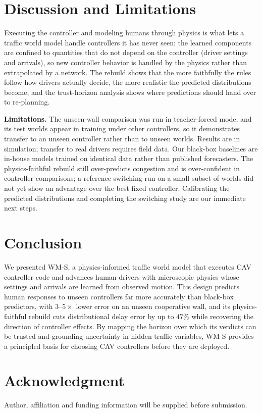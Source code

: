 \documentclass[conference]{IEEEtran}
\begin{document}
\section{Discussion and Limitations}
Executing the controller and modeling humans through physics is what lets a traffic world model handle controllers it has never seen: the learned components are confined to quantities that do not depend on the controller (driver settings and arrivals), so new controller behavior is handled by the physics rather than extrapolated by a network. The rebuild shows that the more faithfully the rules follow how drivers actually decide, the more realistic the predicted distributions become, and the trust-horizon analysis shows where predictions should hand over to re-planning.

\textbf{Limitations.} The unseen-wall comparison was run in teacher-forced mode, and its test worlds appear in training under other controllers, so it demonstrates transfer to an unseen controller rather than to unseen worlds. Results are in simulation; transfer to real drivers requires field data. Our black-box baselines are in-house models trained on identical data rather than published forecasters. The physics-faithful rebuild still over-predicts congestion and is over-confident in controller comparisons; a reference switching run on a small subset of worlds did not yet show an advantage over the best fixed controller. Calibrating the predicted distributions and completing the switching study are our immediate next steps.

\section{Conclusion}
We presented WM-S, a physics-informed traffic world model that executes CAV controller code and advances human drivers with microscopic physics whose settings and arrivals are learned from observed motion. This design predicts human responses to unseen controllers far more accurately than black-box predictors, with $3$--$5\times$ lower error on an unseen cooperative wall, and its physics-faithful rebuild cuts distributional delay error by up to $47\%$ while recovering the direction of controller effects. %
By mapping the horizon over which its verdicts can be trusted and grounding uncertainty in hidden traffic variables, WM-S provides a principled basis for choosing CAV controllers before they are deployed.

\section*{Acknowledgment}
Author, affiliation and funding information will be supplied before submission.



\end{document}

